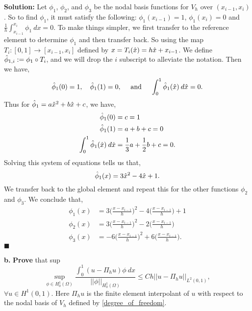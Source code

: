 \documentclass[11pt]{article}
\begin{document}
\textbf{Solution:} Let $\phi_1$, $\phi_2$, and $\phi_3$ be the nodal basis functions for $V_h$ over $(x_{i-1}, x_i)$. 
So to find $\phi_1$, it must satisfy the following: $\phi_1(x_{i-1}) = 1$, $\phi_1(x_i) = 0$ and $\frac{1}{h}\int_{x_{i-1}}^{x_i} \phi_1 \: dx = 0$.
To make things simpler, we first transfer to the reference element to determine $\phi_1$ and then transfer back.
So using the map $T_i : [0,1] \to [x_{i-1}, x_i]$ defined by $x = T_i(\Hat{x}) = h\Hat{x} + x_{i-1}$.
We define $\Hat{\phi}_{1,i} := \phi_1 \circ T_i$, and we will drop the $i$ subscript to alleviate the notation.
Then we have,
\begin{equation*}
    \Hat{\phi}_1(0) = 1, \quad \Hat{\phi}_1(1) = 0, \quad \text{ and } \quad \int_0^1 \Hat{\phi}_1(\Hat{x}) \: d\Hat{x} = 0.
\end{equation*}
Thus for $\Hat{\phi}_1 = a\Hat{x}^2 + b\Hat{x} + c$, we have,
\begin{align*}
    \Hat{\phi}_1(0) &= c = 1 \\
    \Hat{\phi}_1(1) &= a + b + c = 0 \\
    \int_0^1 \Hat{\phi}_1(\Hat{x}) \: d\Hat{x} &= \frac{1}{3}a + \frac{1}{2} b + c = 0.
\end{align*}
Solving this system of equations tells us that,
\begin{equation*}
    \Hat{\phi}_1(x) = 3\Hat{x}^2 - 4\Hat{x} + 1.
\end{equation*}
We transfer back to the global element and repeat this for the other functions $\phi_2$ and $\phi_3$.
We conclude that,
\begin{align*}
    \phi_1(x) &= 3 \big(\frac{x - x_{i-1}}{h} \big)^2 - 4\big(\frac{x - x_{i-1}}{h} \big) + 1 \\
    \phi_2(x) &= 3 \big(\frac{x - x_{i-1}}{h} \big)^2 - 2\big(\frac{x - x_{i-1}}{h} \big) \\
    \phi_3(x) &= -6 \big(\frac{x - x_{i-1}}{h} \big)^2 + 6\big(\frac{x - x_{i-1}}{h} \big).
\end{align*}
$\blacksquare$

\vskip 2cm




\textbf{b.} \textbf{Prove} that
sup 
\begin{equation}
    \sup_{\phi \in H^1_0(\Omega)} \frac{\displaystyle{\int_0^1 ( u - \Pi_h u ) \phi \: dx}}{||\phi||_{H^1_0(\Omega)}} \leq Ch ||u - \Pi_h u ||_{L^2(0,1)},
\end{equation}
$\forall u \in H^1(0,1)$.
Here $\Pi_h u$ is the finite element interpolant of $u$ with respect to the nodal basis of $V_h$ defined by \eqref{degree_of_freedom}.
\end{document}
